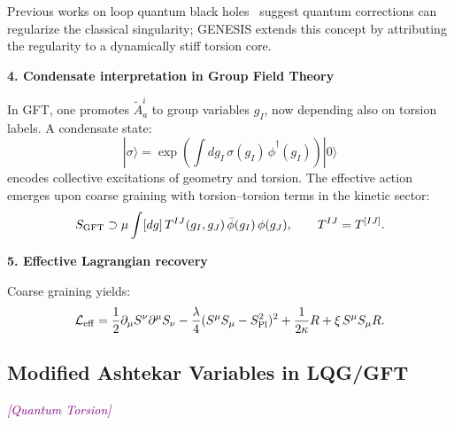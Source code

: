 \documentclass{article}
\newcommand{\Splanck}{\ensuremath{S_{\mathrm{Pl}}}}
\newcommand{\quantumtag}{\textcolor{purple}{\textit{[Quantum Torsion]}}}
\begin{document}
Previous works on loop quantum black holes~\cite{barrau2014} suggest quantum corrections can regularize the classical singularity; GENESIS extends this concept by attributing the regularity to a dynamically stiff torsion core.


\vspace{1em}
\noindent\textbf{4. Condensate interpretation in Group Field Theory}

In GFT, one promotes \( \tilde A^i_a \) to group variables \( g_I \), now depending also on torsion labels. A condensate state:
\begin{equation}\label{eq:auto152}
|\sigma\rangle = \exp\left( \int dg_I\,\sigma(g_I)\,\hat\phi^\dagger(g_I) \right) |0\rangle
\end{equation}
encodes collective excitations of geometry and torsion. The effective action emerges upon coarse graining with torsion–torsion terms in the kinetic sector:
\begin{equation}\label{eq:auto153}
S_{\rm GFT} \supset \mu \int [dg]\,T^{IJ}(g_I, g_J)\,\bar\phi(g_I)\,\phi(g_J),
\qquad
  T^{IJ} = T^{[IJ]}.
\end{equation}

\vspace{1em}
\noindent\textbf{5. Effective Lagrangian recovery}

Coarse graining yields:
\begin{equation}\label{eq:auto154}
\mathcal{L}_{\rm eff} = \frac{1}{2} \partial_\mu S^\nu \partial^\mu S_\nu - \frac{\lambda}{4} (S^\mu S_\mu - \Splanck^2)^2 + \frac{1}{2\kappa} R + \xi\,S^\mu S_\mu R.
\end{equation}

\vspace{1em}
\begin{center}
\end{center}
\medskip



\subsection{Modified Ashtekar Variables in LQG/GFT}
\quantumtag
\end{document}

